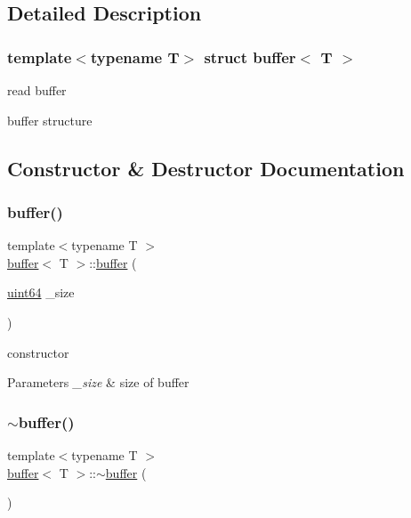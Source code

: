 \subsection{Detailed Description}
\subsubsection*{template$<$typename T$>$\newline
struct buffer$<$ T $>$}

read buffer 

buffer structure 

\subsection{Constructor \& Destructor Documentation}
\mbox{\label{structbuffer_aefd0601854f94ec9c18c05986d218c16}} 
\subsubsection{\texorpdfstring{buffer()}{buffer()}\hspace{0.1cm}{\footnotesize\ttfamily [1/2]}}
{\footnotesize\ttfamily template$<$typename T $>$ \\
\hyperlink{structbuffer}{buffer}$<$ T $>$\+::\hyperlink{structbuffer}{buffer} (\begin{DoxyParamCaption}\item[{\hyperlink{types_8h_a60e8696a4678cd348e991a1f172e53f7}{uint64}}]{\+\_\+size }\end{DoxyParamCaption})\hspace{0.3cm}{\ttfamily [inline]}}



constructor 


\begin{DoxyParams}{Parameters}
{\em \+\_\+size} & size of buffer \\
\hline
\end{DoxyParams}
\mbox{\label{structbuffer_accefc959744e463ae78a996a2f45f81a}} 
\subsubsection{\texorpdfstring{$\sim$buffer()}{~buffer()}\hspace{0.1cm}{\footnotesize\ttfamily [1/2]}}
{\footnotesize\ttfamily template$<$typename T $>$ \\
\hyperlink{structbuffer}{buffer}$<$ T $>$\+::$\sim$\hyperlink{structbuffer}{buffer} (\begin{DoxyParamCaption}{ }\end{DoxyParamCaption})\hspace{0.3cm}{\ttfamily [inline]}}



